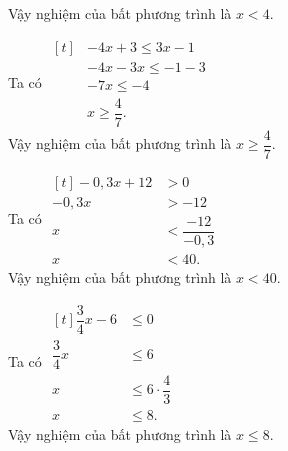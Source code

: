 \begin{vd}
{\begin{listEX}[2]
	Vậy nghiệm của bất phương trình là $x<4$.
	\item 
	Ta có $\begin{aligned}[t] & -4x + 3 \leq 3x - 1\\ & -4x-3x \leq -1-3\\& -7x \leq -4\\& x \geq \dfrac{4}{7}.\end{aligned}$\\
	Vậy nghiệm của bất phương trình là $x \geq \dfrac{4}{7}$.
	\item 
	Ta có $\begin{aligned}[t]
	-0{,}3x+12&>0\\
	-0{,}3x&>-12\\
	x&<\dfrac{-12}{-0{,}3}\\
	x&<40.
	\end{aligned}$\\
	Vậy nghiệm của bất phương trình là $x<40$.\\
	\item 
	Ta có $\begin{aligned}[t]
	\dfrac{3}{4}x-6&\leq0\\
	\dfrac{3}{4}x&\leq6\\
	x&\leq6\cdot\dfrac{4}{3}\\
	x&\leq8.
	\end{aligned}$\\
	Vậy nghiệm của bất phương trình là $x\leq8.$
	\end{listEX}
	}
\end{vd}
